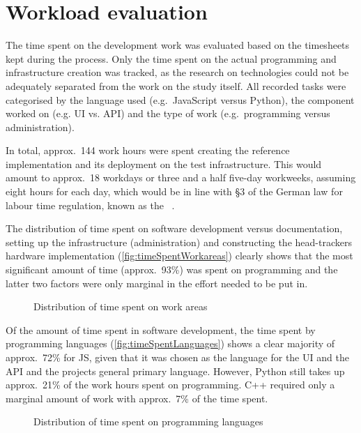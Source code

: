 \section{Workload evaluation}\label{sec:workload-evaluation}

The time spent on the development work was evaluated based on the timesheets kept during the process.
Only the time spent on the actual programming and infrastructure creation was tracked, as the research on technologies could not be adequately separated from the work on the study itself.
All recorded tasks were categorised by the language used (e.g.\ JavaScript versus Python), the component worked on (e.g. \ac{UI} vs. \ac{API}) and the type of work (e.g.\ programming versus administration).

In total, approx.~144 work hours were spent creating the reference implementation and its deployment on the test infrastructure.
This would amount to approx.~18 workdays or three and a half five-day workweeks, assuming eight hours for each day, which would be in line with §3 of the German law for labour time regulation, known as the ~\parencite{abzgPar3}.

The distribution of time spent on software development versus documentation, setting up the infrastructure (administration) and constructing the head-tracker\textquotesingle s hardware implementation (\autoref{fig:timeSpentWorkareas}) clearly shows that the most significant amount of time (approx.~93\%) was spent on programming and the latter two factors were only marginal in the effort needed to be put in.

\begin{figure*}[!ht]
\centering

\caption[Time spent by work area]{Distribution of time spent on work areas\protect}
\label{fig:timeSpentWorkareas}
\end{figure*}

Of the amount of time spent in software development, the time spent by programming languages (\autoref{fig:timeSpentLanguages}) shows a clear majority of approx.~72\% for \ac{JS}, given that it was chosen as the language for the \ac{UI} and the \ac{API} and the project\textquotesingle s general primary language.
However, Python still takes up approx.~21\% of the work hours spent on programming.
C++ required only a marginal amount of work with approx.~7\% of the time spent.

\begin{figure*}[!ht]
\centering
\hfill
\caption[Time spent by programming language]{Distribution of time spent on programming languages\protect}
\label{fig:timeSpentLanguages}
\end{figure*}

